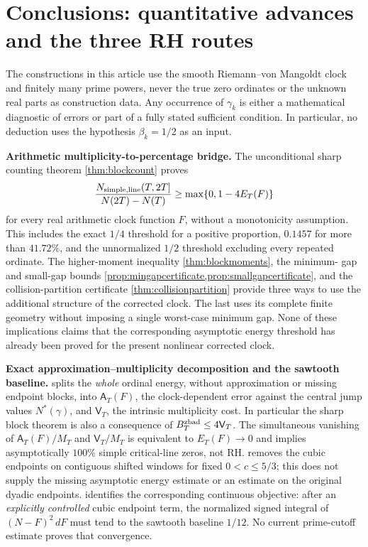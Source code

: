 \documentclass[11pt,reqno]{amsart}
\numberwithin{equation}{section}
\begin{document}
\section{Conclusions: quantitative advances and the three RH routes}
\label{sec:conclusions}
The constructions in this article use the smooth Riemann--von Mangoldt
clock and finitely many prime powers, never the true zero ordinates or
the unknown real parts as construction data.  Any occurrence of
$\gamma_k$ is either a mathematical diagnostic of errors or part of a
fully stated sufficient condition.  In particular, no deduction uses
the hypothesis $\beta_k=1/2$ as an input.

\medskip
\noindent\textbf{Arithmetic multiplicity-to-percentage bridge.}
The unconditional sharp counting theorem \cref{thm:blockcount} proves
\[
  \frac{N_{\rm simple,line}(T,2T]}{N(2T)-N(T)}
  \ge \max\{0,1-4E_T(F)\}
\]
for every real arithmetic clock function $F$, without a monotonicity
assumption.  This includes the exact $1/4$ threshold for a positive
proportion, $0.1457$ for more than $41.72\%$, and the
unnormalized $1/2$ threshold excluding every repeated ordinate.
The higher-moment inequality \cref{thm:blockmoments}, the minimum-
gap and small-gap bounds \cref{prop:mingapcertificate,prop:smallgapcertificate},
and the collision-partition certificate \cref{thm:collisionpartition}
provide three ways to use the additional structure of the corrected
clock.  The last uses its complete finite geometry without imposing a
single worst-case minimum gap.  None of these implications claims
that the corresponding asymptotic energy threshold has already been
proved for the present nonlinear corrected clock.

\medskip

\medskip
\noindent\textbf{Exact approximation--multiplicity decomposition and the sawtooth baseline.}
 splits the \emph{whole} ordinal
energy, without approximation or missing endpoint blocks, into
$\mathsf A_T(F)$, the clock-dependent error against the central
jump values $N^*(\gamma)$, and $\mathsf V_T$, the intrinsic
multiplicity cost.  In particular the sharp block theorem is
also a consequence of $B_T^{\rm zbad}\le4\mathsf V_T$.
The simultaneous vanishing of $\mathsf A_T(F)/M_T$ and
$\mathsf V_T/M_T$ is equivalent to $E_T(F)\to0$ and implies
asymptotically $100\%$ simple critical-line zeros, not RH.
 removes the cubic endpoints on contiguous shifted windows for fixed $0<c\le5/3$; this does not supply the missing asymptotic energy estimate or an estimate on the original dyadic endpoints.  identifies the corresponding
continuous objective: after an \emph{explicitly controlled}
cubic endpoint term, the normalized signed integral of
$(N-F)^2\,dF$ must tend to the sawtooth baseline $1/12$.
No current prime-cutoff estimate proves that convergence.
\end{document}
